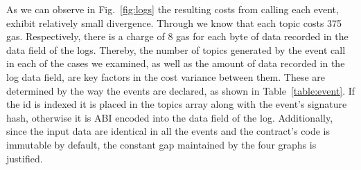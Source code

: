 As we can observe in Fig.~\ref{fig:logs} the resulting costs from calling each event, exhibit relatively small divergence. Through  \citep{wood_2014} we know that each topic costs 375 gas. Respectively, there is a charge of 8 gas for each byte of data recorded in the data field of the logs. Thereby, the number of topics generated by the event call in each of the cases we examined, as well as the amount of data recorded in the log data field, are key factors in the cost variance between them. These are determined by the way the events are declared, as shown in Table~\ref{table:event}. If the id is indexed it is placed in the topics array along with the event’s signature hash, otherwise it is ABI encoded into the data field of the log. Additionally, since the input data are identical in all the events and the contract's code is immutable by default, the constant gap maintained by the four graphs is justified.

\begin{table}[]
\caption{Structure of events and logs included in the experiments}
\centering
\label{table:event}
\end{table}

